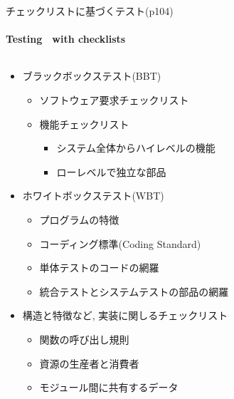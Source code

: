 
\begin{frame}[shrink=20]{チェックリストに基づくテスト(p104)}
\framesubtitle{Testing　with checklists}
\begin{columns}[t]
    \begin{column}{.6\textwidth}
    \begin{itemize}
    \item ブラックボックステスト(BBT)
        \begin{itemize}
        \item ソフトウェア要求チェックリスト
        \item 機能チェックリスト
            \begin{itemize}
            \item システム全体からハイレベルの機能
            \item ローレベルで独立な部品
            \end{itemize}
        \end{itemize}
    \item ホワイトボックステスト(WBT)
        \begin{itemize}
        \item プログラムの特徴
        \item コーディング標準(Coding Standard)
        \item 単体テストのコードの網羅
        \item 統合テストとシステムテストの部品の網羅
    \end{itemize}
    \item 構造と特徴など, 実装に関しるチェックリスト
        \begin{itemize}
        \item 関数の呼び出し規則
        \item 資源の生産者と消費者
        \item モジュール間に共有するデータ
        \end{itemize}
    \end{itemize}
    \end{column}
        \begin{column}{.35\textwidth}

\end{column}
\end{columns}
\end{frame}
